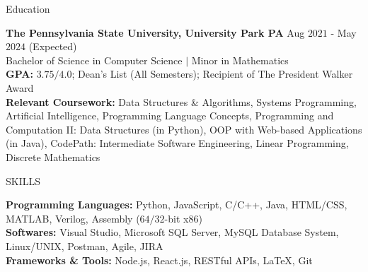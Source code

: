 \documentclass{resume} %
\begin{document}

\begin{rSection}{Education}

{\bf The Pennsylvania State University, University Park PA} \hfill {Aug $2021$ - May $2024$ (Expected)}\\
{Bachelor of Science in Computer Science $\vert$ Minor in Mathematics}\\
{\bf GPA:} $3.75/4.0$; Dean's List (All Semesters); Recipient of The President Walker Award\\
{\bf Relevant Coursework:} Data Structures \& Algorithms, Systems Programming, Artificial Intelligence, Programming Language Concepts, Programming and Computation II: Data Structures (in Python), OOP with Web-based Applications (in Java), CodePath: Intermediate Software Engineering, Linear Programming, Discrete Mathematics
\end{rSection}


\begin{rSection}{SKILLS}

{\bf Programming Languages:} Python, JavaScript, C/C++, Java, HTML/CSS, MATLAB, Verilog, Assembly ($64/32$-bit x$86$)\\
{\bf Softwares:} Visual Studio, Microsoft SQL Server, MySQL Database System, Linux/UNIX, Postman, Agile, JIRA\\
{\bf Frameworks \& Tools:} Node.js, React.js, RESTful APIs, \LaTeX, Git

\end{rSection}
\end{document}
